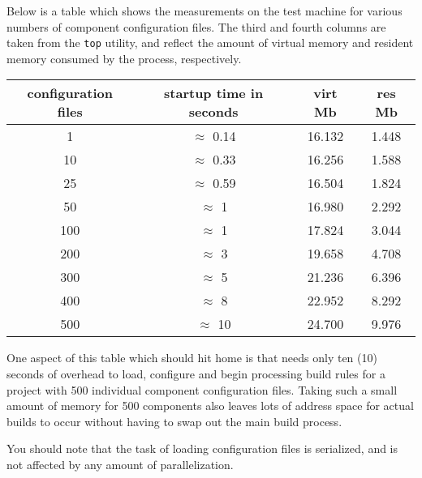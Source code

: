 Below is a table which shows the measurements on the test machine for
various numbers of component configuration files.  The third and
fourth columns are taken from the \texttt{top} utility, and reflect
the amount of virtual memory and resident memory consumed by the
process, respectively.

\begin{tabular}{|c|c|c|c|}
  \hline configuration files  & startup time in seconds & virt Mb & res Mb \\
  \hline   1 & $\approx$ 0.14  & 16.132 & 1.448 \\
  \hline  10 & $\approx$ 0.33  & 16.256 & 1.588 \\
  \hline  25 & $\approx$ 0.59  & 16.504 & 1.824 \\
  \hline  50 & $\approx$ 1  & 16.980 & 2.292 \\
  \hline 100 & $\approx$ 1  & 17.824 & 3.044 \\
  \hline 200 & $\approx$ 3  & 19.658 & 4.708 \\
  \hline 300 & $\approx$ 5  & 21.236 & 6.396 \\
  \hline 400 & $\approx$ 8  & 22.952 & 8.292 \\
  \hline 500 & $\approx$ 10 & 24.700 & 9.976 \\
  \hline
\end{tabular}

One aspect of this table which should hit home is that \lmsbw needs
only ten (10) seconds of overhead to load, configure and begin
processing build rules for a project with 500 individual component
configuration files.  Taking such a small amount of memory for 500
components also leaves lots of address space for actual builds to
occur without having to swap out the main build process.

You should note that the task of loading configuration files is
serialized, and is not affected by any amount of parallelization.

